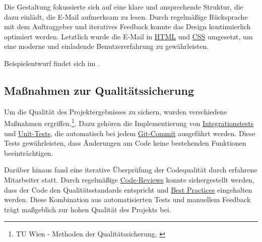 Die Gestaltung fokussierte sich auf eine klare und ansprechende Struktur, die dazu einlädt, die E-Mail aufmerksam zu lesen. Durch regelmäßige Rücksprache mit dem Auftraggeber und iteratives Feedback konnte das Design kontinuierlich optimiert werden. Letztlich wurde die E-Mail in \hyperlink{HTML}{\textcolor{AOBlau}{HTML}} und \hyperlink{CSS}{\textcolor{AOBlau}{CSS}} umgesetzt, um eine moderne und einladende Benutzererfahrung zu gewährleisten.

Beispielentwurf findet sich im .

\subsection{Maßnahmen zur Qualitätssicherung}
\label{sec:Qualitaetssicherung}

Um die Qualität des Projektergebnisses zu sichern, wurden verschiedene Maßnahmen ergriffen.\footnote{TU Wien - Methoden der Qualitätssicherung, \cite{Quality}}. Dazu gehören die Implementierung von \hyperlink{IntegrationTests}{\textcolor{AOBlau}{Integrationstests}} und \hyperlink{UnitTests}{\textcolor{AOBlau}{Unit-Tests}}, die automatisch bei jedem \hyperlink{GitLab}{\textcolor{AOBlau}{Git-Commit}} ausgeführt werden. Diese Tests gewährleisten, dass Änderungen am Code keine bestehenden Funktionen beeinträchtigen.

Darüber hinaus fand eine iterative Überprüfung der Codequalität durch erfahrene Mitarbeiter statt. Durch regelmäßige \hyperlink{CodeReview}{\textcolor{AOBlau}{Code-Reviews}} konnte sichergestellt werden, dass der Code den Qualitätsstandards entspricht und \hyperlink{BestPractices}{\textcolor{AOBlau}{Best Practices}} eingehalten werden. Diese Kombination aus automatisierten Tests und manuellem Feedback trägt maßgeblich zur hohen Qualität des Projekts bei.
